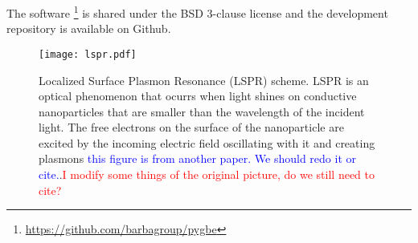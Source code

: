 The software \footnote{\url{https://github.com/barbagroup/pygbe}} is shared 
under the BSD 3-clause license and the development repository is available on 
Github.







\begin{figure}[h] %
   \centering
   \texttt{[image: lspr.pdf]} 
   \caption{Localized Surface Plasmon Resonance (LSPR) scheme. LSPR is an 
            optical phenomenon that ocurrs when light shines on conductive 
            nanoparticles that are smaller than the wavelength of the incident 
            light. The free electrons on the surface of the nanoparticle are 
            excited by the incoming electric field oscillating with it and 
            creating plasmons \textcolor{blue}{this figure is from another paper. We should redo it or cite.}.\textcolor{red}{I modify some things of the original picture, do we still need to cite?}}
   \label{fig:lspr}
\end{figure}




